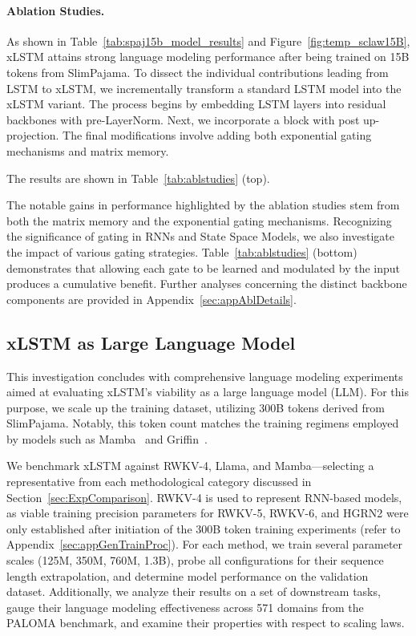 \paragraph{Ablation Studies.}
As shown in Table~\ref{tab:spaj15b_model_results} and Figure~\ref{fig:temp_sclaw15B}, xLSTM attains strong language modeling performance after being trained on 15B tokens from SlimPajama. To dissect the individual contributions leading from LSTM to xLSTM, we incrementally transform a standard LSTM model into the xLSTM variant. The process begins by embedding LSTM layers into residual backbones with pre-LayerNorm. Next, we incorporate a block with post up-projection. The final modifications involve adding both exponential gating mechanisms and matrix memory.

The results are shown in Table~\ref{tab:ablstudies} (top). 

The notable gains in performance highlighted by the ablation studies stem from both the matrix memory and the exponential gating mechanisms. Recognizing the significance of gating in RNNs and State Space Models, we also investigate the impact of various gating strategies. Table~\ref{tab:ablstudies} (bottom) demonstrates that allowing each gate to be learned and modulated by the input produces a cumulative benefit. Further analyses concerning the distinct backbone components are provided in Appendix~\ref{sec:appAblDetails}.

\subsection{xLSTM as Large Language Model}
\label{sec:ExpLanguage}

This investigation concludes with comprehensive language modeling experiments aimed at evaluating xLSTM’s viability as a large language model (LLM). For this purpose, we scale up the training dataset, utilizing 300B tokens derived from SlimPajama. Notably, this token count matches the training regimens employed by models such as Mamba~\citep{Gu:24arxiv} and Griffin~\citep{De:24arxiv}.

We benchmark xLSTM against RWKV-4, Llama, and Mamba—selecting a representative from each methodological category discussed in Section~\ref{sec:ExpComparison}. RWKV-4 is used to represent RNN-based models, as viable training precision parameters for RWKV-5, RWKV-6, and HGRN2 were only established after initiation of the 300B token training experiments (refer to Appendix~\ref{sec:appGenTrainProc}). For each method, we train several parameter scales (125M, 350M, 760M, 1.3B), probe all configurations for their sequence length extrapolation, and determine model performance on the validation dataset. Additionally, we analyze their results on a set of downstream tasks, gauge their language modeling effectiveness across 571 domains from the PALOMA benchmark, and examine their properties with respect to scaling laws.

